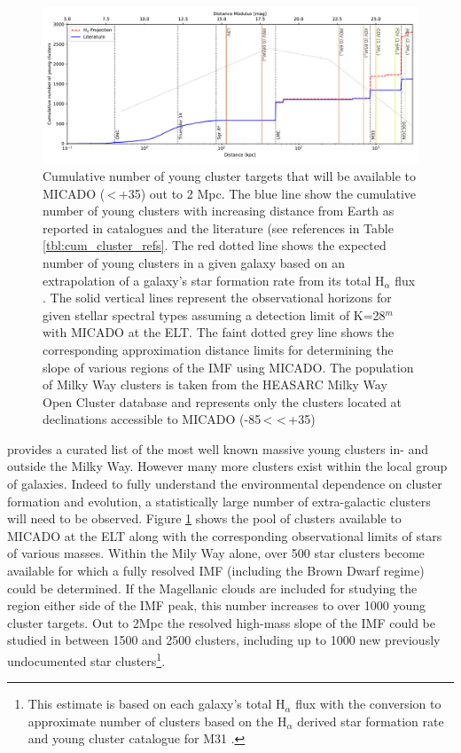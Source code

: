 \begin{figure}

    \centering
    \includegraphics[width=\textwidth]{images/young_clusters_within_2Mpc_incl_MW.pdf}

    \caption{Cumulative number of young cluster targets that will be available to MICADO (\textdelta\,\textless\,+35\textdegree) out to 2 Mpc. The blue line show the cumulative number of young clusters with increasing distance from Earth as reported in catalogues and the literature (see references in Table \ref{tbl:cum_cluster_refs}.
    The red dotted line shows the expected number of young clusters in a given galaxy based on an extrapolation of a galaxy's star formation rate from its total H$_\alpha$ flux \citep{caldwell09}.
    The solid vertical lines represent the observational horizons for given stellar spectral types assuming a detection limit of K=28$^m$ with MICADO at the ELT. The faint dotted grey line shows the corresponding approximation distance limits for determining the slope of various regions of the IMF using MICADO.
    The population of Milky Way clusters is taken from the HEASARC Milky Way Open Cluster database \citep{heasarc_mwsc} and represents only the clusters located at declinations accessible to MICADO (-85\textdegree\,\textless\,\textdelta\,\textless\,+35\textdegree)
    }
    \label{fig:local_group_cluster_number}

\end{figure}

\citet{portegies2010} provides a curated list of the most well known massive young clusters in- and outside the Milky Way. However many more clusters exist within the local group of galaxies. 
Indeed to fully understand the environmental dependence on cluster formation and evolution, a statistically large number of extra-galactic clusters will need to be observed. 
Figure \ref{fig:local_group_cluster_number} shows the pool of clusters available to MICADO at the ELT along with the corresponding observational limits of stars of various masses. 
Within the Mily Way alone, over 500 star clusters become available for which a fully resolved IMF (including the Brown Dwarf regime) could be determined. 
If the Magellanic clouds are included for studying the region either side of the IMF peak, this number increases to over 1000 young cluster targets. 
Out to 2Mpc the resolved high-mass slope of the IMF could be studied in between 1500 and 2500 clusters, including up to 1000 new previously undocumented star clusters\footnote{This estimate is based on each galaxy's total H$_\alpha$ flux with the conversion to approximate number of clusters based on the H$_\alpha$ derived star formation rate and young cluster catalogue for M31 \citep{caldwell09}.}.

